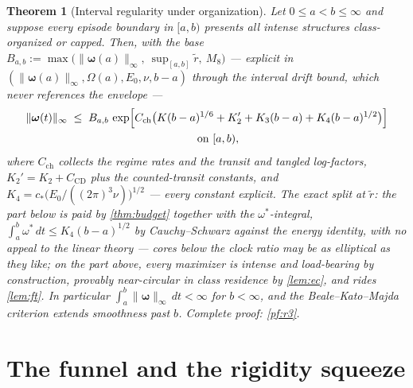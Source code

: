 \documentclass[11pt,letterpaper]{amsart}
\newtheorem{theorem}{Theorem}[section]
\theoremstyle{definition}
\theoremstyle{remark}
\newcommand{\om}{\omega}
\newcommand{\vort}{\boldsymbol{\omega}}
\newcommand{\norm}[1]{\lVert #1 \rVert}
\begin{document}
\begin{theorem}[Interval regularity under organization]\label{thm:r3}
Let $0\le a<b\le\infty$ and suppose every episode boundary in $[a,b)$ presents all
intense structures class-organized or capped. Then, with the base
$B_{a,b}:=\max\bigl(\norm{\vort(a)}_\infty,\ \sup_{[a,b]}\tilde r,\ M_8\bigr)$ ---
explicit in $(\norm{\vort(a)}_\infty,\Omega(a),E_0,\nu,b-a)$ through the interval
drift bound, which never references the envelope ---
\begin{multline*}
\norm{\vort(t)}_\infty\;\le\;B_{a,b}\,
\exp\Bigl[C_{\mathrm{ch}}\bigl(K(b-a)^{1/6}+K_2'+K_3(b-a)+K_4(b-a)^{1/2}\bigr)\Bigr]\\
\qquad\text{on }[a,b),
\end{multline*}
where $C_{\mathrm{ch}}$ collects the regime rates and the transit and tangled
log-factors, $K_2'=K_2+C_{\mathrm{CD}}$ plus the counted-transit constants, and
$K_4=c_*\bigl(E_0/((2\pi)^3\nu)\bigr)^{1/2}$ --- every constant explicit. The exact
split at $\tilde r$: the part below is paid by \cref{thm:budget} together with the
$\om^*$-integral, $\int_a^b\om^*\,dt\le K_4(b-a)^{1/2}$ by Cauchy--Schwarz against
the energy identity, with no appeal to the linear theory --- cores below the clock
ratio may be as elliptical as they like; on the part above, every maximizer is
intense and load-bearing by construction, provably near-circular in class residence
by \cref{lem:ec}, and rides \cref{lem:ft}. In particular
$\int_a^b\norm{\vort}_\infty\,dt<\infty$ for $b<\infty$, and the Beale--Kato--Majda
criterion \cite{BealeKatoMajda1984} extends smoothness past $b$. Complete proof:
\cref{pf:r3}.
\end{theorem}

\section{The funnel and the rigidity squeeze}\label{sec:funnel}
\end{document}
